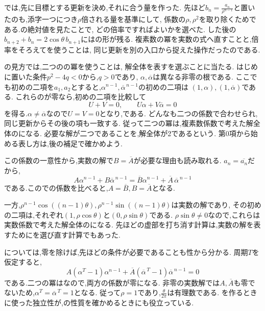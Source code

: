   では,先に目標とする更新を決め,それに合う量を作った.
  先ほど$b_n=\frac{a_n}{\rho^{n-1}}$と置いたのも,添字一つにつき$\rho$倍される量を基準にして,
  係数の$\rho,\rho^2$を取り除くためである.の絶対値を見たことで,
  どの倍率ですればよいかを選べた.
  した後の$b_{n+2}+b_n=2\cos\theta\,b_{n+1}$にはの形が残る.
  複素数の冪を実数の式へ直すことと,倍率をそろえてを使うことは,
  同じ更新を別の入口から捉えた操作だったのである.

  の見方では,二つのの冪を使うことは,
  解全体を表すを選ぶことに当たる.
  はじめに置いた条件$p^2-4q<0$から,$q>0$であり,
  $\alpha,\overline\alpha$は異なる非零の根である.
  ここでも初めの二項を$a_1,a_2$とすると,$\alpha^{n-1},\overline\alpha^{\,n-1}$の初めの二項は
  $(1,\alpha),(1,\overline\alpha)$である.
  これらのが零なら,初めの二項を比較して
  \[
    U+V=0,\qquad U\alpha+V\overline\alpha=0
  \]
  を得る.$\alpha\ne\overline\alpha$なので$U=V=0$となり,である.
  どんなも二つの係数で合わせられ,同じ更新からその後の項も一致する.
  従って二つの冪は,複素数係数で考えた解全体のになる.
  必要な解が二つであることを,解全体が2であるという.
  第0項から始める表し方は,後の補足で確かめよう.

  この係数の一意性から,実数の解で$B=\overline A$が必要な理由も読み取れる.
  $a_n=\overline{a_n}$だから,
  \[
    A\alpha^{n-1}+B\overline\alpha^{\,n-1}
    =\overline B\alpha^{n-1}+\overline A\,\overline\alpha^{\,n-1}
  \]
  である.このでの係数を比べると,$A=\overline B,B=\overline A$となる.

  一方,$\rho^{n-1}\cos((n-1)\theta),\rho^{n-1}\sin((n-1)\theta)$は実数の解であり,
  その初めの二項は,それぞれ$(1,\rho\cos\theta)$と$(0,\rho\sin\theta)$である.
  $\rho\sin\theta\ne0$なので,これらは実数係数で考えた解全体のになる.
  先ほどの虚部を打ち消す計算は,実数の解を表すためにを選び直す計算でもあった.

  については,零を除けば,先ほどの条件が必要であることも性から分かる.
  周期$T$を仮定すると,
  \[
    A(\alpha^T-1)\alpha^{n-1}
    +\overline A(\overline\alpha^{\,T}-1)\overline\alpha^{\,n-1}=0
  \]
  である.二つの冪はなので,両方の係数が零になる.
  非零の実数解では$A,\overline A$も零でないため,$\alpha^T=\overline\alpha^{\,T}=1$となる.
  従って$\rho=1$であり,$\frac{\theta}{2\pi}$は有理数である.
  を作るときに使った独立性が,の性質を確かめるときにも役立っている.

